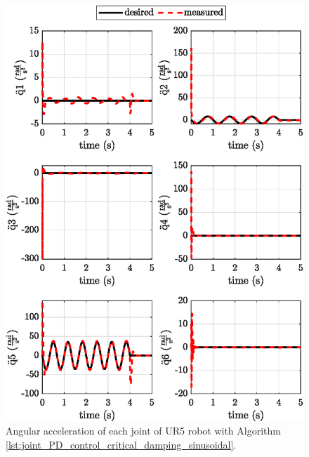 \begin{figure}[H]
    \centering
    \includegraphics{images/act_1.5_sin/joint_acceleration.eps}
    \caption{Angular acceleration of each joint of UR5 robot with Algorithm \ref{lst:joint_PD_control_critical_damping_sinusoidal}.}
    \label{fig:act_1.5_sin_joint_acceleration}
\end{figure}


